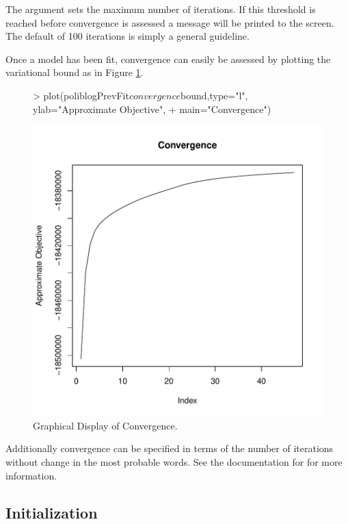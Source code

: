 \documentclass[nojss]{jss}
\begin{document}
The argument  sets the maximum number of iterations.  If this threshold is reached before convergence is assessed a message will be printed to the screen.  The default of 100 iterations is simply a general guideline.

Once a model has been fit, convergence can easily be assessed by plotting the variational bound as in Figure \ref{fig:converge}.

\begin{figure}[t!]
\begin{center}
\begin{Schunk}
\begin{Sinput}
> plot(poliblogPrevFit$convergence$bound,type="l", ylab="Approximate Objective",
+     main="Convergence")
\end{Sinput}
\end{Schunk}
\includegraphics{stmVignette-024}
\caption{Graphical Display of Convergence.}
\label{fig:converge}
\end{center}
\end{figure}

Additionally convergence can be specified in terms of the number of iterations without change in the most probable words.  See the documentation for  for more information.

\subsection{Initialization}
\end{document}
